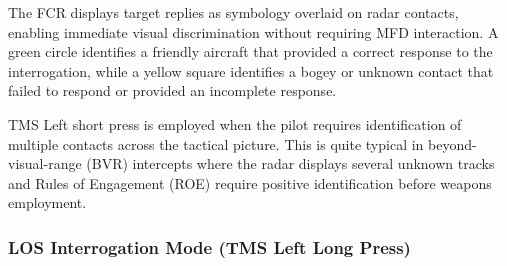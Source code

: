 \documentclass[11pt, a4paper, twoside]{report}
\begin{document}
The FCR displays target replies as symbology overlaid on radar contacts, enabling immediate visual discrimination without requiring MFD interaction. A green circle identifies a friendly aircraft that provided a correct response to the interrogation, while a yellow square identifies a bogey or unknown contact that failed to respond or provided an incomplete response.

TMS Left short press is employed when the pilot requires identification of multiple contacts across the tactical picture. This is quite typical in beyond-visual-range (BVR) intercepts where the radar displays several unknown tracks and Rules of Engagement (ROE) require positive identification before weapons employment.

\subsubsection{LOS Interrogation Mode (TMS Left Long Press)}
\label{sec:C4-S3-S5-S2}



\end{document}
